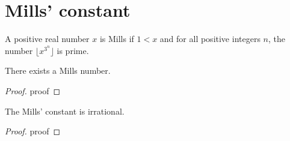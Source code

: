 %

\chapter{Mills' constant}

\begin{definition}
    \label{def:mills}
    A positive real number $x$ is Mills if $1 < x$ and
    for all positive integers $n$, the number $\lfloor x^{3^n} \rfloor$ is prime.
\end{definition}

\begin{proposition}
    \label{prop:mills}
    There exists a Mills number.
\end{proposition}

\begin{proof}
    proof
\end{proof}

\begin{theorem}
    \label{thm:mills_irrational}
    The Mills' constant is irrational.    
\end{theorem}

\begin{proof}
    proof
\end{proof}